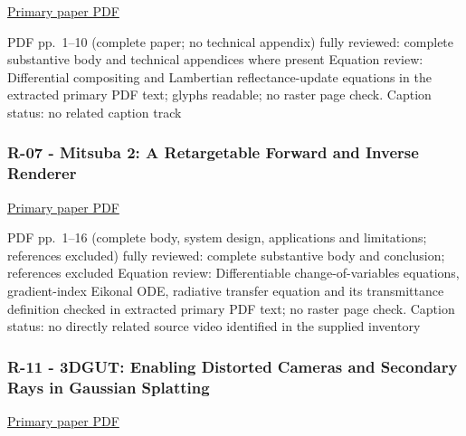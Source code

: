 \hypertarget{04-visual-computing-ii-ch036-r-01---rendering-synthetic-objects-into-real-scenes-bridging-traditional-and-image-based-graphics-with-global-illumination-and-high-dynamic-range-photography}{}

\href{https://www.pauldebevec.com/Research/IBL/debevec-siggraph98.pdf}{Primary paper PDF}

PDF pp.~1--10 (complete paper; no technical appendix) fully reviewed: complete substantive body and technical appendices where present Equation review: Differential compositing and Lambertian reflectance-update equations in the extracted primary PDF text; glyphs readable; no raster page check. Caption status: no related caption track

\subsubsection{R-07 - Mitsuba 2: A Retargetable Forward and Inverse Renderer}\label{04-visual-computing-ii-ch036-r-07---mitsuba-2-a-retargetable-forward-and-inverse-renderer}

\hypertarget{04-visual-computing-ii-ch036-r-07---mitsuba-2-a-retargetable-forward-and-inverse-renderer}{}

\href{https://rgl.s3.eu-central-1.amazonaws.com/media/papers/NimierDavidVicini2019Mitsuba2_7.pdf}{Primary paper PDF}

PDF pp.~1--16 (complete body, system design, applications and limitations; references excluded) fully reviewed: complete substantive body and conclusion; references excluded Equation review: Differentiable change-of-variables equations, gradient-index Eikonal ODE, radiative transfer equation and its transmittance definition checked in extracted primary PDF text; no raster page check. Caption status: no directly related source video identified in the supplied inventory

\subsubsection{R-11 - 3DGUT: Enabling Distorted Cameras and Secondary Rays in Gaussian Splatting}\label{04-visual-computing-ii-ch036-r-11---3dgut-enabling-distorted-cameras-and-secondary-rays-in-gaussian-splatting}

\hypertarget{04-visual-computing-ii-ch036-r-11---3dgut-enabling-distorted-cameras-and-secondary-rays-in-gaussian-splatting}{}

\href{https://research.nvidia.com/labs/toronto-ai/3DGUT/res/3DGUT_full_resolution.pdf}{Primary paper PDF}

